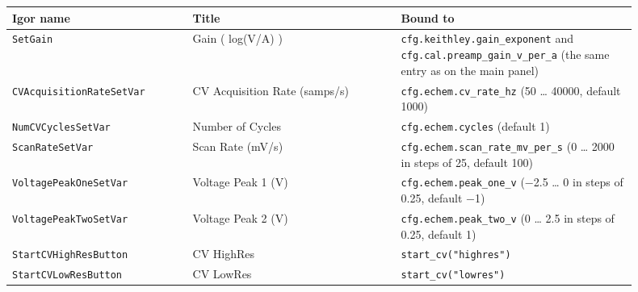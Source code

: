 \small\setlength{\LTleft}{0pt}\setlength{\LTright}{\fill}
\begin{longtable}{@{}>{\raggedright\arraybackslash}p{0.26\linewidth}>{\raggedright\arraybackslash}p{0.30\linewidth}>{\raggedright\arraybackslash}p{0.34\linewidth}@{}}
\toprule
\textbf{Igor name} & \textbf{Title} & \textbf{Bound to} \\
\midrule\endhead
\texttt{Set\discretionary{}{}{}Gain} & Gain ( log(V/A) ) & \texttt{cfg.\discretionary{}{}{}keithley.\discretionary{}{}{}gain\_\discretionary{}{}{}exponent} and \texttt{cfg.\discretionary{}{}{}cal.\discretionary{}{}{}preamp\_\discretionary{}{}{}gain\_\discretionary{}{}{}v\_\discretionary{}{}{}per\_\discretionary{}{}{}a} (the same entry as on the main panel) \\
\texttt{CVAcquisition\discretionary{}{}{}Rate\discretionary{}{}{}Set\discretionary{}{}{}Var} & CV Acquisition Rate (samps/s) & \texttt{cfg.\discretionary{}{}{}echem.\discretionary{}{}{}cv\_\discretionary{}{}{}rate\_\discretionary{}{}{}hz} (50 \ldots{} 40000, default 1000) \\
\texttt{Num\discretionary{}{}{}CVCycles\discretionary{}{}{}Set\discretionary{}{}{}Var} & Number of Cycles & \texttt{cfg.\discretionary{}{}{}echem.\discretionary{}{}{}cycles} (default 1) \\
\texttt{Scan\discretionary{}{}{}Rate\discretionary{}{}{}Set\discretionary{}{}{}Var} & Scan Rate (mV/s) & \texttt{cfg.\discretionary{}{}{}echem.\discretionary{}{}{}scan\_\discretionary{}{}{}rate\_\discretionary{}{}{}mv\_\discretionary{}{}{}per\_\discretionary{}{}{}s} (0 \ldots{} 2000 in steps of 25, default 100) \\
\texttt{Voltage\discretionary{}{}{}Peak\discretionary{}{}{}One\discretionary{}{}{}Set\discretionary{}{}{}Var} & Voltage Peak 1 (V) & \texttt{cfg.\discretionary{}{}{}echem.\discretionary{}{}{}peak\_\discretionary{}{}{}one\_\discretionary{}{}{}v} (−2.5 \ldots{} 0 in steps of 0.25, default −1) \\
\texttt{Voltage\discretionary{}{}{}Peak\discretionary{}{}{}Two\discretionary{}{}{}Set\discretionary{}{}{}Var} & Voltage Peak 2 (V) & \texttt{cfg.\discretionary{}{}{}echem.\discretionary{}{}{}peak\_\discretionary{}{}{}two\_\discretionary{}{}{}v} (0 \ldots{} 2.5 in steps of 0.25, default 1) \\
\texttt{Start\discretionary{}{}{}CVHigh\discretionary{}{}{}Res\discretionary{}{}{}Button} & CV HighRes & \texttt{start\_\discretionary{}{}{}cv("highres")} \\
\texttt{Start\discretionary{}{}{}CVLow\discretionary{}{}{}Res\discretionary{}{}{}Button} & CV LowRes & \texttt{start\_\discretionary{}{}{}cv("lowres")} \\
\bottomrule
\end{longtable}
\normalsize

